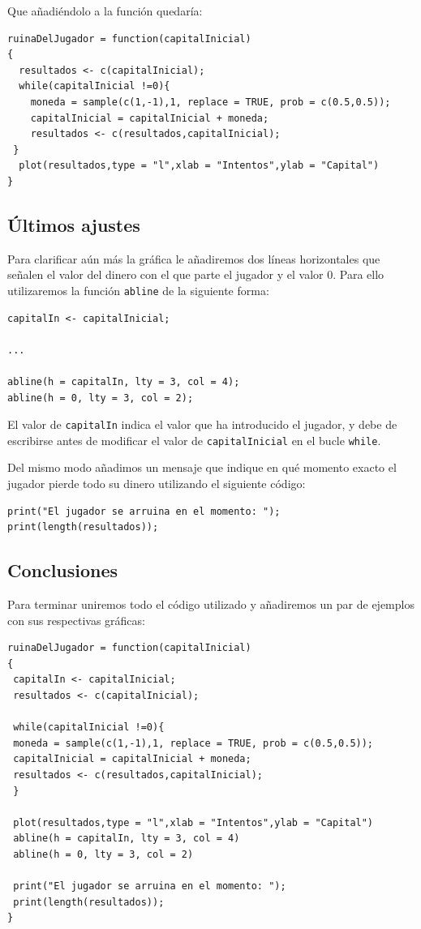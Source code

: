 \documentclass[10pt,a4paper]{article}
\begin{document}
Que añadiéndolo a la función quedaría:

\begin{verbatim}
ruinaDelJugador = function(capitalInicial)
{
  resultados <- c(capitalInicial);
  while(capitalInicial !=0){
    moneda = sample(c(1,-1),1, replace = TRUE, prob = c(0.5,0.5));
    capitalInicial = capitalInicial + moneda;
    resultados <- c(resultados,capitalInicial);
 }
  plot(resultados,type = "l",xlab = "Intentos",ylab = "Capital")
}
\end{verbatim}

\subsection{Últimos ajustes}
Para clarificar aún más la gráfica le añadiremos dos líneas horizontales que señalen el valor del dinero con el que parte el jugador y el valor 0. Para ello utilizaremos la función {\tt abline} de la siguiente forma:

\begin{verbatim}
capitalIn <- capitalInicial;

...

abline(h = capitalIn, lty = 3, col = 4);
abline(h = 0, lty = 3, col = 2);
\end{verbatim}

El valor de {\tt capitalIn} indica el valor que ha introducido el jugador, y debe de escribirse antes de modificar el valor de {\tt capitalInicial} en el bucle {\tt while}.

Del mismo modo añadimos un mensaje que indique en qué momento exacto el jugador pierde todo su dinero utilizando el siguiente código:

\begin{verbatim}
print("El jugador se arruina en el momento: ");
print(length(resultados));
\end{verbatim}

\subsection{Conclusiones}
Para terminar uniremos todo el código utilizado y añadiremos un par de ejemplos con sus respectivas gráficas:

\begin{verbatim}
ruinaDelJugador = function(capitalInicial)
{
 capitalIn <- capitalInicial;
 resultados <- c(capitalInicial);

 while(capitalInicial !=0){
 moneda = sample(c(1,-1),1, replace = TRUE, prob = c(0.5,0.5));
 capitalInicial = capitalInicial + moneda;
 resultados <- c(resultados,capitalInicial);
 }

 plot(resultados,type = "l",xlab = "Intentos",ylab = "Capital")
 abline(h = capitalIn, lty = 3, col = 4)
 abline(h = 0, lty = 3, col = 2)

 print("El jugador se arruina en el momento: ");
 print(length(resultados));
}
\end{verbatim}
\end{document}

